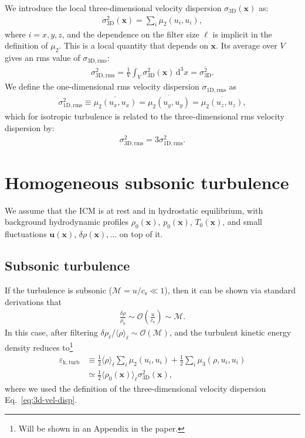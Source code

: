 \documentclass[]{article}
\newcommand{\ud}{\,\mathrm{d}}
\begin{document}
We introduce the local three-dimensional velocity dispersion $\sigma_{\mathrm{3D}} (\bm x)$ as:
%
\begin{align}\label{eq:3d-vel-disp}
	\sigma_{\mathrm{3D}}^2 (\bm x)= \sum_i \mu_2(u_i, u_i),
\end{align}
%
where $i=x,y,z$, and the dependence on the filter size $\ell$ is implicit in the definition of $\mu_2$. This is a local quantity that depends on $\bm x$. Its average over $V$ gives an rms value of $\sigma_{\mathrm{3D},\mathrm{rms}}$:
%
\begin{align}
	\sigma_{\mathrm{3D},\mathrm{rms}}^2  = \frac{1}{V} \int_V \sigma_{\mathrm{3D}}^2 (\bm x) \ud^3 x = \overline{\sigma_{\mathrm{3D}}^2}.
\end{align}
%
We define the one-dimensional rms velocity dispersion
$\sigma_{\mathrm{1D},\mathrm{rms}}$ as
%
\begin{align}
	\sigma_{\mathrm{1D},\mathrm{rms}}^2 \equiv \overline{\mu_2(u_x, u_x)} = \overline{\mu_2(u_y, u_y)} = \overline{\mu_2(u_z, u_z)},
\end{align}
%
which for isotropic turbulence is related to the three-dimensional rms velocity dispersion by:
%
\begin{align}
		\sigma_{\mathrm{3D},\mathrm{rms}}^2 = 3 \sigma_{\mathrm{1D},\mathrm{rms}}^2.
\end{align}




\section{Homogeneous subsonic turbulence}

We assume that the ICM is at rest and in hydrostatic equilibrium, with background hydrodynamic profiles $\rho_0 (\bm x)$, $p_0 (\bm x)$, $T_0 (\bm x)$, and small fluctuations $\bm u (\bm x)$, $\delta \rho (\bm x), \ldots$ on top of it.

\subsection{Subsonic turbulence}

If the turbulence is subsonic ($\mathcal{M} =  u / c_{\mathrm{s}} \ll 1$), then it can be shown via standard derivations that 
%
\begin{align}
	\frac{\delta \rho}{\rho_0} \sim \mathcal{O} \left(\frac{u}{c_{\mathrm{s}}}\right) \sim \mathcal{M}.
\end{align}
%
In this case, after filtering $\delta \rho_\ell / \langle \rho \rangle_\ell \sim \mathcal{O} (\mathcal{M})$, and the turbulent kinetic energy density reduces to\footnote{Will be shown in an Appendix in the paper.}
%
\begin{align}
	\varepsilon_{\mathrm{k,turb}} &\equiv \frac{1}{2} \langle \rho \rangle_\ell \sum_i \mu_2(u_i, u_i) + \frac{1}{2} \sum_i \mu_3(\rho, u_i, u_i) \nonumber \\ 
	&\simeq \frac{1}{2} \langle \rho_0 (\bm x) \rangle_\ell \sigma_{\mathrm{3D}}^2 (\bm x), 
\end{align}
%
where we used the definition of the three-dimensional velocity dispersion Eq.~\eqref{eq:3d-vel-disp}.
\end{document}
